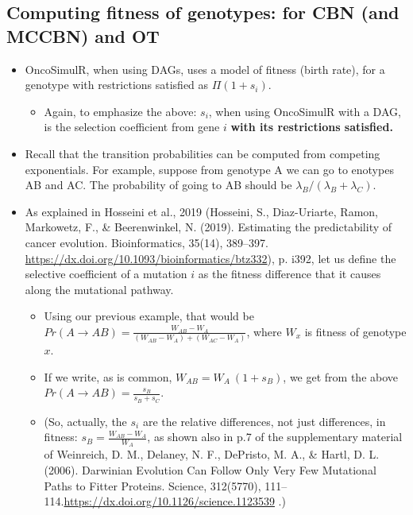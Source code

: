 \documentclass[11pt]{article}
\begin{document}
\subsection{Computing fitness of genotypes: for CBN (and MCCBN) and OT}
\label{sec:org65f3210}
\begin{itemize}
\item OncoSimulR, when using DAGs, uses a model of fitness (birth rate), for a  genotype with restrictions satisfied as \(\Pi (1 + s_i)\). 
\begin{itemize}
\item Again, to emphasize the above: \(s_i\), when using OncoSimulR with a DAG, is  the selection coefficient from gene \(i\) \textbf{with its restrictions satisfied.}
\end{itemize}
\item Recall that the transition probabilities can be computed from competing   exponentials. For example, suppose from genotype A we can go to enotypes AB and AC. The probability of going to AB should be \(\lambda_B/(\lambda_B +  \lambda_C)\).
\item As explained in Hosseini et al., 2019 (Hosseini, S., Diaz-Uriarte, Ramon, Markowetz, F., \& Beerenwinkel, N. (2019). Estimating the predictability of cancer evolution. Bioinformatics,   35(14), 389–397. \url{https://dx.doi.org/10.1093/bioinformatics/btz332}), p. i392, let us define the selective  coefficient of a mutation \(i\) as the fitness difference that it causes along the mutational pathway.

\begin{itemize}
\item Using our previous example, that would be \(Pr(A \rightarrow AB) = \frac{W_{AB}- W_{A}}{(W_{AB} - W_A) + (W_{AC} - W_A)}\), where \(W_x\) is fitness of  genotype \(x\).

\item If we write, as is common, \(W_{AB} = W_A \  (1 + s_B)\), we get from the above \(Pr(A \rightarrow AB) = \frac{s_B}{s_B + s_C}\).

\item (So, actually, the \(s_i\) are the relative differences, not just
differences, in fitness: \(s_B = \frac{W_{AB} - W_A}{W_A}\), as shown also in p.7 of the supplementary material of Weinreich, D. M., Delaney, N. F., DePristo, M. A., \& Hartl, D. L. (2006). Darwinian Evolution Can Follow Only Very Few Mutational Paths to Fitter Proteins. Science, 312(5770), 111–114.\url{https://dx.doi.org/10.1126/science.1123539} .)


\end{itemize}
\end{itemize}
\end{document}
